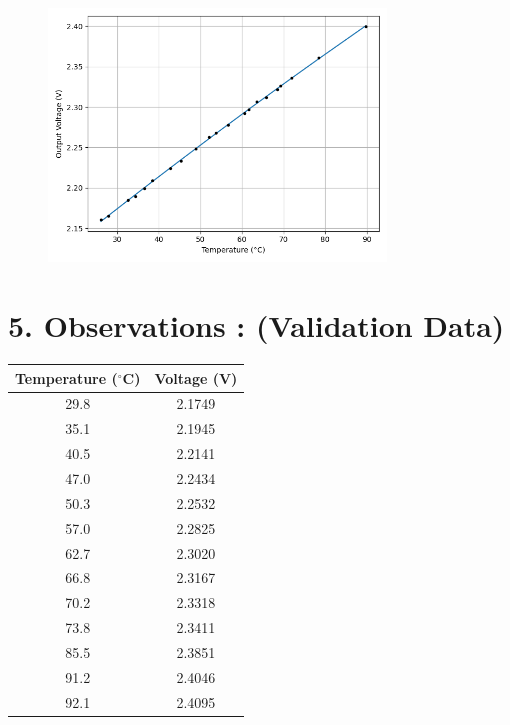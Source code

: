 \documentclass[12pt,a4paper]{article}
\begin{document}
\begin{figure}[h!]
    \centering
    \includegraphics[width=0.8\textwidth]{../figs/train.png}
\end{figure}

\newpage

\section*{5. Observations : (Validation Data)}

\begin{table}[h!]
\centering
\begin{tabular}{|c|c|}
\hline
\textbf{Temperature ($^\circ$C)} & \textbf{Voltage (V)} \\ \hline
29.8 & 2.1749 \\ 
35.1 & 2.1945 \\ 
40.5 & 2.2141 \\ 
47.0 & 2.2434 \\ 
50.3 & 2.2532 \\ 
57.0 & 2.2825 \\ 
62.7 & 2.3020 \\ 
66.8 & 2.3167 \\ 
70.2 & 2.3318 \\ 
73.8 & 2.3411 \\ 
85.5 & 2.3851 \\ 
91.2 & 2.4046 \\ 
92.1 & 2.4095 \\ \hline
\end{tabular}
\end{table}
\end{document}
